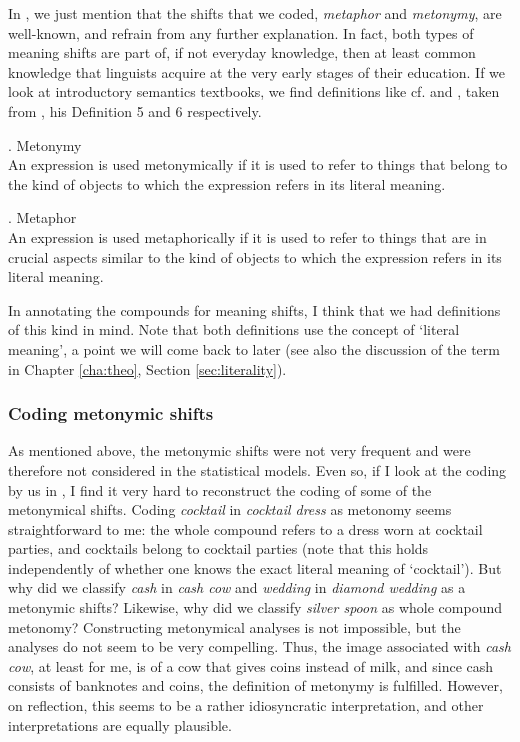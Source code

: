 In \citet[3]{BellandSchaefer:2013}, we just mention that the shifts that we
coded, \emph{metaphor} and \emph{metonymy}, are well-known, and refrain
from any further explanation. In fact, both types of meaning shifts
are part of, if not everyday knowledge, then at least common
knowledge that linguists acquire at the very early stages of their
education. If we look at introductory semantics textbooks, we
find definitions like
cf. \Next and \NNext, taken from \citet[52--53]{Loebner:2013}, his
Definition 5 and 6 respectively.

\pagebreak[4]
\ex. Metonymy\\
An expression is used metonymically if it is used to refer to things
that belong to the kind of objects to which the expression refers in
its literal meaning.

\ex. \label{def:metaphor-loebner-2013}
Metaphor\\
An expression is used metaphorically if it is used to refer to things
that are in crucial aspects similar to the kind of objects to which
the expression refers in its literal meaning.\\

In annotating the compounds for meaning shifts, I think that we had definitions of this kind in mind. Note that both definitions use the concept of `literal meaning', a
point we will come back to later (see also the discussion of the term
in Chapter \ref{cha:theo}, Section \ref{sec:literality}).

\subsubsection{Coding metonymic shifts}
\label{sec:bellschaefer2013-coding-metonymic}
As mentioned above, the metonymic shifts were not very frequent and were therefore not considered in the statistical models. Even so,
if I look at the coding by us in \citet{BellandSchaefer:2013}, I find it
very hard to reconstruct the coding of some of the metonymical
shifts. Coding
\emph{cocktail} in \emph{cocktail dress} as metonomy seems
straightforward to me: the
whole compound refers to a dress worn at cocktail parties, and
cocktails belong to cocktail parties (note that this holds independently
of whether one knows the exact literal meaning of `cocktail').
But why did we classify \emph{cash} in \emph{cash cow} and \emph{wedding}
in \emph{diamond wedding} as a metonymic
shifts? Likewise, why did we classify \emph{silver
  spoon} as whole compound metonomy? Constructing metonymical analyses is not impossible, but the analyses do
not seem to be very compelling. Thus, the image associated with
\emph{cash cow}, at least for me, is of a cow that gives coins instead
of milk, and since cash consists of banknotes and coins, the
definition of metonymy is fulfilled. However, on reflection, this
seems to be a rather idiosyncratic interpretation, and other interpretations are
equally plausible. 

